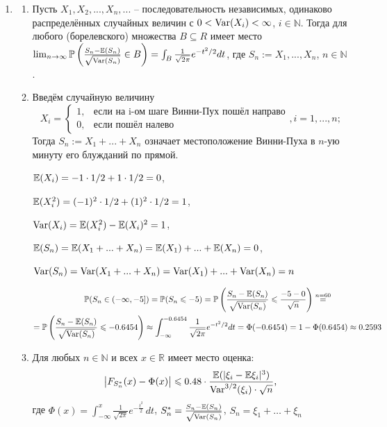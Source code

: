 \documentclass[12pt, a4paper]{article}\usepackage[]{graphicx}\usepackage[]{color}
\begin{document}
\begin{enumerate}
\item \begin{enumerate}
	\item Пусть $X_1, X_2, ..., X_n, ...$ – последовательность независимых, одинаково распределённых случайных величин с $0<\operatorname{Var}(X_i)<\infty$, $i \in \mathbb{N}$.  Тогда для любого (борелевского) множества $B \subseteq R$ имеет место $\lim_{n \to \infty} \mathbb{P}\left(\frac{S_n - \mathbb{E}(S_n)}{\sqrt{\operatorname{Var}(S_n)}} \in B\right) = \int_B \frac{1}{\sqrt{2\pi}}e^{-t^2/2} dt$, где $S_n := X_1, ..., X_n$, $n \in \mathbb{N}$.
	\item Введём случайную величину 
	\[
	X_i = \begin{cases}
	1, & \text{если на i-ом шаге Винни-Пух пошёл направо} \\
	0, & \text{если пошёл налево}
	\end{cases}
	, i=1,..., n;
	\]
	Тогда $S_n := X_1 +...+X_n$ означает местоположение Винни-Пуха в $n$-ую минуту его блужданий по прямой.
	
	$\mathbb{E}(X_i) = -1 \cdot 1/2 + 1 \cdot 1/2 = 0$,
	
	$\mathbb{E}(X_i^2) = (-1)^2 \cdot 1/2 + (1)^2 \cdot 1/2 = 1$,
	
	$\operatorname{Var}(X_i) = \mathbb{E}(X_i^2) - \mathbb{E}(X_i)^2 = 1$, 
	
	$\mathbb{E}(S_n) = \mathbb{E}(X_1 + ... + X_n ) = \mathbb{E}(X_1) + ... + \mathbb{E}(X_n) = 0$, 
	
	$\operatorname{Var}(S_n) = \operatorname{Var}(X_1 + ... + X_n ) = \operatorname{Var}(X_1) + ... + \operatorname{Var}(X_n) = n$
	
	\begin{multline}
	\mathbb{P}(S_n \in (-\infty, -5]) = \mathbb{P}(S_n \leqslant -5) = \mathbb{P}\left( \frac{S_n-\mathbb{E}(S_n)}{\sqrt{\operatorname{Var}(S_n)}} \leqslant \frac{-5-0}{\sqrt{n}} \right) \stackrel{n=60}{=} \\
	 =\mathbb{P}\left( \frac{S_n-\mathbb{E}(S_n)}{\sqrt{\operatorname{Var}(S_n)}} \leqslant -0.6454\right) \approx \int_{-\infty}^{-0.6454} \frac{1}{\sqrt{2\pi}} e^{-t^2/2} dt = \Phi(-0.6454) = 1-\Phi(0.6454) \approx0.2593
	\end{multline}
	\item Для любых $n \in \mathbb{N}$ и всех $x \in \mathbb{R}$ имеет место оценка:
	\[
	\bigl|F_{S_n^{*}}(x) - \Phi(x)\bigr| \leqslant 0.48 \cdot \frac{\mathbb{E}(|\xi_i - \mathbb{E}\xi_i|^3)}{\operatorname{Var}^{3/2}(\xi_i)\cdot\sqrt{n}} \text{,}
	\]
	где $\Phi(x) = \int_{-\infty}^{x}\frac{1}{\sqrt{2\pi}}e^{-\frac{t^2}{2}}\,dt$, \; $S_n^* = \frac{S_n - \mathbb{E}(S_n)}{\sqrt{\operatorname{Var}(S_n)}}$, \; $S_n = \xi_1 + \ldots + \xi_n$
	

\end{enumerate}
\end{enumerate}
\end{document}
